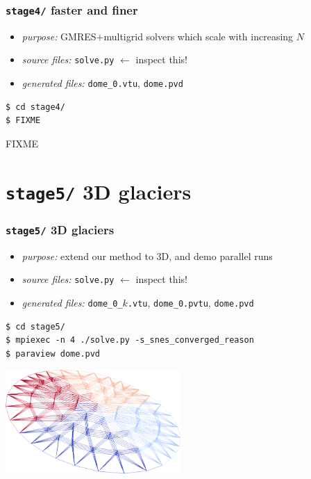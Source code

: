 \documentclass[10pt,hyperref,dvipsnames]{beamer}
\begin{document}
\begin{frame}[fragile]
\frametitle{\texttt{stage4/} \qquad faster and finer}

\begin{itemize}
\item \emph{purpose:} GMRES$+$multigrid solvers which scale with increasing $N$
\item \emph{source files:} \texttt{solve.py} \hfill \alert{$\gets$ inspect this!}
\item \emph{generated files:} \texttt{dome\_0.vtu}, \texttt{dome.pvd}
\end{itemize}

\bigskip
\begin{Verbatim}
$ cd stage4/
$ FIXME
\end{Verbatim}

\bigskip
\begin{center}
FIXME %
\end{center}
\end{frame}


\section{\texttt{stage5/} \qquad 3D glaciers}

\begin{frame}[fragile]
\frametitle{\texttt{stage5/} \qquad 3D glaciers}

\begin{itemize}
\item \emph{purpose:} extend our method to 3D, and demo parallel runs
\item \emph{source files:} \texttt{solve.py} \hfill \alert{$\gets$ inspect this!}
\item \emph{generated files:} \texttt{dome\_0\_}$k$\texttt{.vtu}, \texttt{dome\_0.pvtu}, \texttt{dome.pvd}
\end{itemize}

\bigskip
\begin{Verbatim}
$ cd stage5/
$ mpiexec -n 4 ./solve.py -s_snes_converged_reason
$ paraview dome.pvd
\end{Verbatim}

\bigskip
\begin{center}
\includegraphics[width=0.5\textwidth]{figs/stage5.png}
\end{center}
\end{frame}
\end{document}

